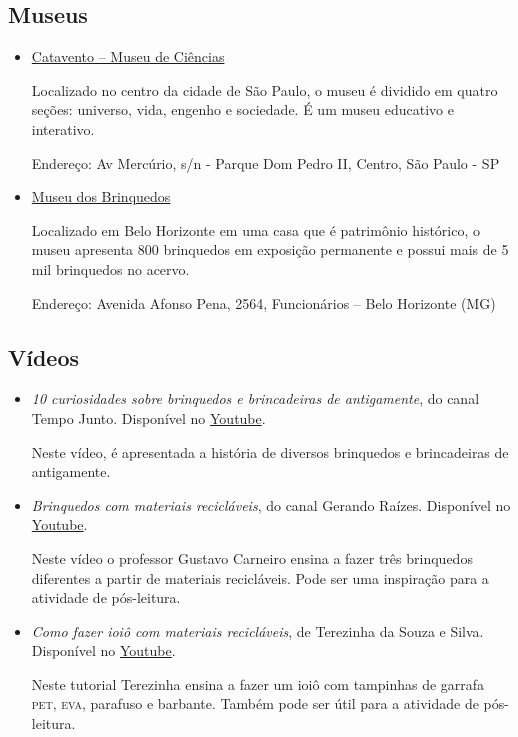 \documentclass[11pt]{extarticle}
\begin{document}
\subsection{Museus}

\begin{itemize}

\item \href{https://museucatavento.org.br/}{Catavento – Museu de Ciências}

Localizado no centro da cidade de São Paulo, o museu é dividido em quatro seções: universo, vida, engenho e sociedade. É um museu educativo e interativo.

Endereço: Av Mercúrio, s/n - Parque Dom Pedro II, Centro, São Paulo - SP

\item \href{http://www.museudosbrinquedos.org.br/}{Museu dos Brinquedos}

Localizado em Belo Horizonte em uma casa que é patrimônio histórico, o museu apresenta 800 brinquedos em exposição permanente e possui mais de 5 mil brinquedos no acervo.

Endereço: Avenida Afonso Pena, 2564, Funcionários – Belo Horizonte (MG)

\end{itemize}

\subsection{Vídeos}

\begin{itemize}

\item \textit{10 curiosidades sobre brinquedos e brincadeiras de antigamente}, do canal Tempo Junto. Disponível no \href{https://www.youtube.com/watch?v=oGzmQm7RZGQ&ab_channel=Tempojunto}{Youtube}. 

Neste vídeo, é apresentada a história de diversos brinquedos e brincadeiras de antigamente.

\item \textit{Brinquedos com materiais recicláveis}, do canal Gerando Raízes. Disponível no \href{https://www.youtube.com/watch?v=qeNmZrRDfrw&ab_channel=GERANDORAIZES}{Youtube}. 

Neste vídeo o professor Gustavo Carneiro ensina a fazer três brinquedos diferentes a partir de materiais recicláveis. Pode ser uma inspiração para a atividade de pós-leitura.

\item \textit{Como fazer ioiô com materiais recicláveis}, de Terezinha da Souza e Silva. Disponível no \href{https://www.youtube.com/watch?v=iWO3JFAAvJc&ab_channel=TerezinhadeSouzadaSilva}{Youtube}. 

Neste tutorial Terezinha ensina a fazer um ioiô com tampinhas de garrafa \textsc{pet}, \textsc{eva}, parafuso e barbante. Também pode ser útil para a atividade de pós-leitura. 

\end{itemize}
\end{document}
